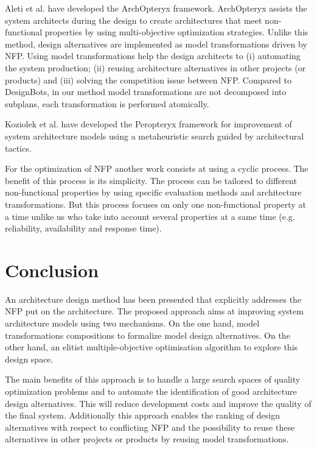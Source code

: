 \documentclass[conference]{IEEEtran}
\begin{document}
Aleti et al.\cite{Gr5069138} have developed the ArchOpteryx framework. ArchOpteryx assists the system architects during the design to create architectures that meet non-functional properties by using multi-objective optimization strategies. Unlike this method, design alternatives are implemented as model transformations driven by NFP. Using model transformations help the design architects to (i) automating the system production; (ii) reusing architecture alternatives in other projects (or products) and (iii) solving the competition issue between NFP. Compared to DesignBots\cite{Diaz-Pace:2007:UPT:1784860.1784865}, in our method model transformations are not decomposed into subplans, each transformation is performed atomically.

Koziolek et al.\cite{Koziolek:2011:PAA:2000259.2000267} have developed the Peropteryx framework for improvement of system architecture models using a metaheuristic search guided by architectural tactics.

For the optimization of NFP another work consists at using a cyclic process\cite{Bosch99softwarearchitecture}. The benefit of this process is its simplicity. The process can be tailored to different non-functional properties by using specific evaluation methods and architecture transformations. But this process focuses on only one non-functional property at a time unlike us who take into account several properties at a same time (e.g. reliability, availability and response time).

\section{Conclusion}
\label{Conclu}
An architecture design method has been presented that explicitly addresses the NFP put on the architecture. The proposed approach aims at improving system architecture models using two mechanisms. On the one hand, model transformations compositions to formalize model design alternatives. On the other hand, an elitist multiple-objective optimisation algorithm to explore this design space.

The main benefits of this approach is to handle a large search spaces of quality optimization problems and to automate the identification of good architecture design alternatives. This will reduce development costs and improve the quality of the final system. Additionally this approach enables the ranking of design alternatives with respect to conflicting NFP and the possibility to reuse these alternatives in other projects or products by reusing model transformations.
\end{document}
